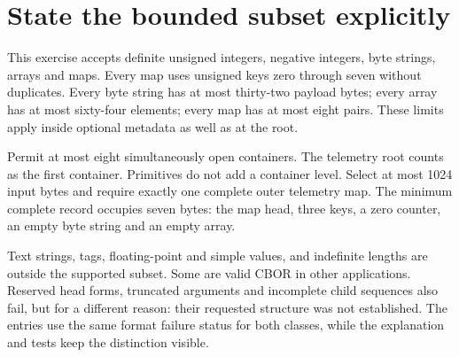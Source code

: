 \section{State the bounded subset explicitly}
This exercise accepts definite unsigned integers, negative integers, byte strings,
arrays and maps. Every map uses unsigned keys zero through seven without duplicates.
Every byte string has at most thirty-two payload bytes; every array has at most
sixty-four elements; every map has at most eight pairs. These limits apply inside
optional metadata as well as at the root.

Permit at most eight simultaneously open containers. The telemetry root counts as the
first container. Primitives do not add a container level. Select at most 1024 input
bytes and require exactly one complete outer telemetry map. The minimum complete
record occupies seven bytes: the map head, three keys, a zero counter, an empty byte
string and an empty array.

Text strings, tags, floating-point and simple values, and indefinite lengths are outside
the supported subset. Some are valid CBOR in other applications. Reserved head forms,
truncated arguments and incomplete child sequences also fail, but for a different
reason: their requested structure was not established. The entries use the same format
failure status for both classes, while the explanation and tests keep the distinction
visible.
